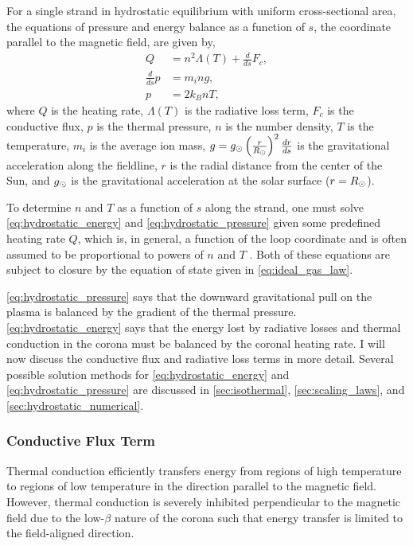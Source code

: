 For a single strand in hydrostatic equilibrium with uniform cross-sectional area, the equations of pressure and energy balance as a function of $s$, the coordinate parallel to the magnetic field, are given by,
\begin{align}
Q &= n^2\Lambda(T) + \frac{d}{ds}F_c, \label{eq:hydrostatic_energy} \\
\frac{d}{ds}p &= m_ing, \label{eq:hydrostatic_pressure} \\
p &= 2k_BnT, \label{eq:ideal_gas_law}
\end{align}
where $Q$ is the heating rate, $\Lambda(T)$ is the radiative loss term, $F_c$ is the conductive flux, $p$ is the thermal pressure, $n$ is the number density, $T$ is the temperature, $m_i$ is the average ion mass, $g=g_\odot\left(\frac{r}{R_\odot}\right)^2\frac{dr}{ds}$ is the gravitational acceleration along the fieldline, $r$ is the radial distance from the center of the Sun, and $g_\odot$ is the gravitational acceleration at the solar surface ($r=R_\odot$).

To determine $n$ and $T$ as a function of $s$ along the strand, one must solve \autoref{eq:hydrostatic_energy} and \autoref{eq:hydrostatic_pressure} given some predefined heating rate $Q$, which is, in general, a function of the loop coordinate and is often assumed to be proportional to powers of $n$ and $T$ \citep{priest_magnetohydrodynamics_2014}. Both of these equations are subject to closure by the equation of state given in \autoref{eq:ideal_gas_law}.

\autoref{eq:hydrostatic_pressure} says that the downward gravitational pull on the plasma is balanced by the gradient of the thermal pressure. \autoref{eq:hydrostatic_energy} says that the energy lost by radiative losses and thermal conduction in the corona must be balanced by the coronal heating rate. I will now discuss the conductive flux and radiative loss terms in more detail. Several possible solution methods for \autoref{eq:hydrostatic_energy} and \autoref{eq:hydrostatic_pressure} are discussed in \autoref{sec:isothermal}, \ref{sec:scaling_laws}, and \ref{sec:hydrostatic_numerical}.

\subsubsection{Conductive Flux Term}\label{sec:heat-flux}

Thermal conduction efficiently transfers energy from regions of high temperature to regions of low temperature in the direction parallel to the magnetic field. However, thermal conduction is severely inhibited perpendicular to the magnetic field due to the low-$\beta$ nature of the corona such that energy transfer is limited to the field-aligned direction. 

